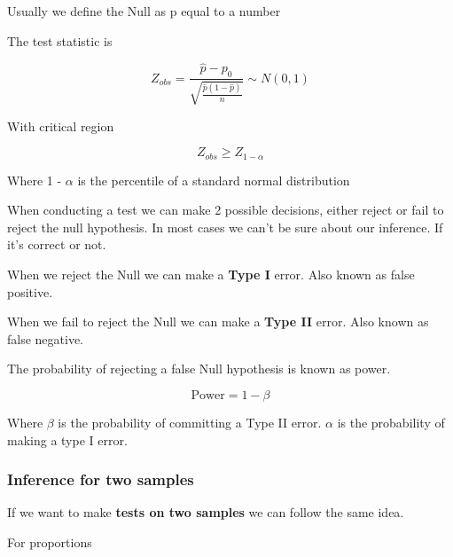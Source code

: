 \vspace{10pt}

Usually we define the Null as p equal to a number

\vspace{10pt}

The test statistic is

\begin{equation*}
    Z_{obs} = \frac{\hat{p}- p_0}{\sqrt{\frac{\hat{p}(1-\hat{p})}{n}}} \sim N(0,1)
\end{equation*}

With critical region

\begin{equation*}
    Z_{obs} \geq Z_{1 - \alpha}
\end{equation*}

Where 1 - $\alpha$ is the percentile of a standard normal distribution


\vspace{10pt}

When conducting a test we can make 2 possible decisions, either reject or fail to reject the null hypothesis. In most cases we can't be sure about our inference. If it's correct or not.


\vspace{10pt}

When we reject the Null we can make a \textbf{Type I} error. Also known as false positive.

When we fail to reject the Null we can make a \textbf{Type II} error. Also known as false negative.

\vspace{10pt}

The probability of rejecting a false Null hypothesis is known as power. 

\begin{equation*}
    \text{Power} = 1 - \beta
\end{equation*}

Where $\beta$ is the probability of committing a Type II error. $\alpha$ is the probability of making a type I error.

\subsubsection{Inference for two samples}

If we want to make \textbf{tests on two samples} we can follow the same idea.

For proportions

